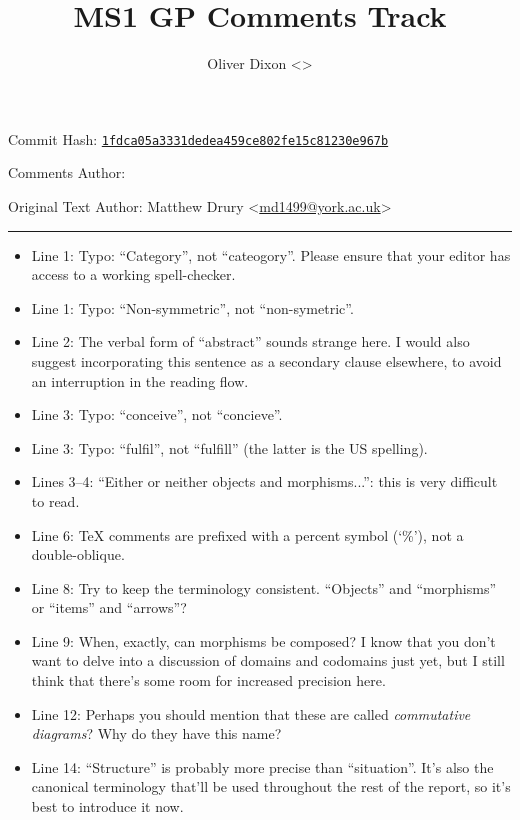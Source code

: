\documentclass{article}
\author{Oliver Dixon \textless\yorkemail{od641}\textgreater}
\title{MS1 GP Comments Track}
\makeatletter
\newcommand{\originalauthor}{Matthew Drury \textless\yorkemail{md1499}\textgreater}
\newcommand{\commithashlong}{1fdca05a3331dedea459ce802fe15c81230e967b}
\renewcommand{\headrulewidth}{.5pt}
\newcommand{\yorkemail}[1]{\href{mailto:#1@york.ac.uk}{#1@york.ac.uk}}
\newcommand{\commitref}[1]{\href{https://github.com/oliverdixon/MS1GP/%
        commit/\commithashlong}{\texttt{#1}}}
\newcommand{\subtitle}{%
        \vspace{-.3\baselineskip}
        \begin{center}
                Commit Hash: \commitref{\commithashlong}
                \vspace{.3\baselineskip}

                Comments Author: \@author

                Original Text Author: \originalauthor
        \end{center}
        \vspace{2\baselineskip}
        \par\vspace{-2em}\noindent\rule{\textwidth}{\headrulewidth}\vspace{1em}
}
\makeatother
\begin{document}
\thispagestyle{title}
\pagestyle{fancy}
\makeatletter
\section*{\@title}
\makeatother
\subtitle
\begin{itemize}
        \item Line 1: Typo: ``Category'', not ``cateogory''. Please ensure that
        your editor has access to a working spell-checker.

        \item Line 1: Typo: ``Non-symmetric'', not ``non-symetric''.

        \item Line 2: The verbal form of ``abstract'' sounds strange here. I
        would also suggest incorporating this sentence as a secondary clause
        elsewhere, to avoid an interruption in the reading flow.

        \item Line 3: Typo: ``conceive'', not ``concieve''.

        \item Line 3: Typo: ``fulfil'', not ``fulfill'' (the latter is the US
        spelling).

        \item Lines 3--4: ``Either or neither objects and morphisms...'': this
        is very difficult to read.

        \item Line 6: TeX comments are prefixed with a percent symbol (‘\%'),
        not a double-oblique.

        \item Line 8: Try to keep the terminology consistent. ``Objects'' and
        ``morphisms'' or ``items'' and ``arrows''?

        \item Line 9: When, exactly, can morphisms be composed? I know that you
        don't want to delve into a discussion of domains and codomains just yet,
        but I still think that there's some room for increased precision here.

        \item Line 12: Perhaps you should mention that these are called
        \textit{commutative diagrams}? Why do they have this name?

        \item Line 14: ``Structure'' is probably more precise than
        ``situation''.  It's also the canonical terminology that'll be used
        throughout the rest of the report, so it's best to introduce it now.


\end{itemize}
\end{document}
